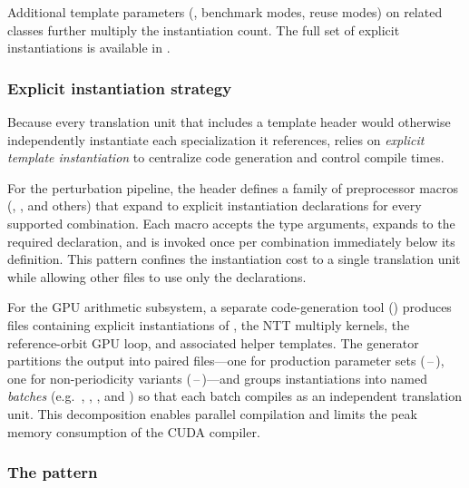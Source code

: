 Additional template parameters (, benchmark modes, reuse
modes) on related classes further multiply the instantiation count.  The
full set of explicit instantiations is available in
.


\subsubsection{Explicit instantiation strategy}
\label{subsec:template-explicit-inst}

Because every translation unit that includes a template header would
otherwise independently instantiate each specialization it references,
\FractalShark{} relies on \emph{explicit template instantiation} to
centralize code generation and control compile times.

For the perturbation pipeline, the header
 defines a family of preprocessor macros
(,
, and others) that
expand to explicit instantiation declarations for every supported
 combination.  Each macro accepts
the type arguments, expands to the required  declaration,
and is invoked once per combination immediately below its definition.
This pattern confines the instantiation cost to a single translation
unit while allowing other files to use only the declarations.

For the GPU arithmetic subsystem, a separate code-generation tool
() produces  files containing
explicit instantiations of , the NTT multiply
kernels, the reference-orbit GPU loop, and associated helper templates.
The generator partitions the output into paired
files---one for production parameter sets
(\,--\,),
one for non-periodicity variants
(\,--\,)---and groups
instantiations into named \emph{batches} (e.g.\
, ,
, and ) so that each batch compiles as an
independent translation unit.  This decomposition enables parallel
compilation and limits the peak memory consumption of the CUDA
compiler.


\subsubsection{The  pattern}
\label{subsec:template-sharkparams}

